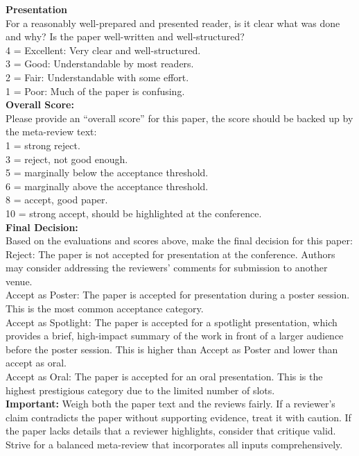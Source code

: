 \begin{figure*}[h]
\begin{prompt}[title={Prompt \thetcbcounter: LLM-as-Meta-Reviewer: Dimension COT}]
\textbf{Presentation}\\
For a reasonably well-prepared and presented reader, is it clear what was done and why? Is the paper well-written and well-structured?\\
4 = Excellent: Very clear and well-structured.\\
3 = Good: Understandable by most readers.\\
2 = Fair: Understandable with some effort.\\
1 = Poor: Much of the paper is confusing.\\ 

\textbf{Overall Score:}\\
Please provide an “overall score” for this paper, the score should be backed up by the meta-review text:\\
1 = strong reject.\\
3 = reject, not good enough.\\
5 = marginally below the acceptance threshold.\\
6 = marginally above the acceptance threshold.\\
8 = accept, good paper.\\
10 = strong accept, should be highlighted at the conference.\\

\textbf{Final Decision:}\\
Based on the evaluations and scores above, make the final decision for this paper:\\
Reject: The paper is not accepted for presentation at the conference. Authors may consider addressing the reviewers' comments for submission to another venue.\\
Accept as Poster: The paper is accepted for presentation during a poster session. This is the most common acceptance category.\\
Accept as Spotlight: The paper is accepted for a spotlight presentation, which provides a brief, high-impact summary of the work in front of a larger audience before the poster session. This is higher than Accept as Poster and lower than accept as oral.\\
Accept as Oral: The paper is accepted for an oral presentation. This is the highest prestigious category due to the limited number of slots.\\

\textbf{Important:} Weigh both the paper text and the reviews fairly. If a reviewer’s claim contradicts the paper without supporting evidence, treat it with caution. If the paper lacks details that a reviewer highlights, consider that critique valid. Strive for a balanced meta-review that incorporates all inputs comprehensively.\\


\end{prompt}
\end{figure*}

